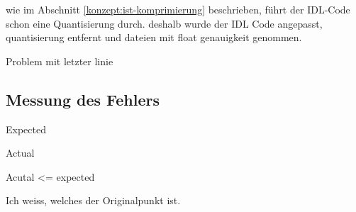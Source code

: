 wie im Abschnitt \ref{konzept:ist-komprimierung} beschrieben, führt der IDL-Code schon eine Quantisierung durch. deshalb wurde der IDL Code angepasst, quantisierung entfernt und dateien mit float genauigkeit genommen.  

Problem mit letzter linie

\subsection{Messung des Fehlers}
Expected

Actual

Acutal <= expected

Ich weiss, welches der Originalpunkt ist.
